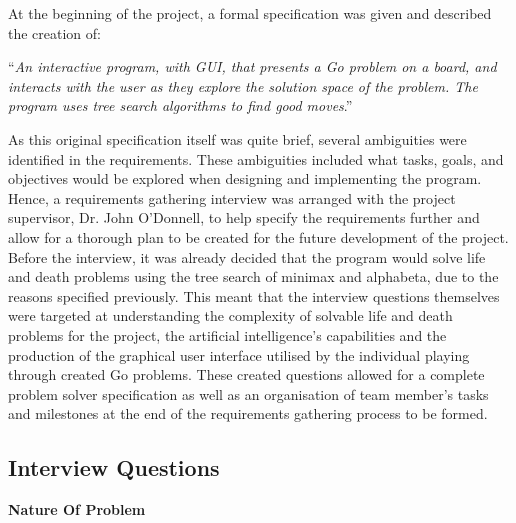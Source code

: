 \documentclass{l3proj}
\begin{document}
At the beginning of the project, a formal specification was given and described the creation of: 
\begin{center}
“\textit{An interactive program, with GUI, that presents a Go problem on a board, and interacts with the user as they explore the solution space of the problem. The program uses tree search algorithms to find good moves}.”  
\end{center}
As this original specification itself was quite brief, several ambiguities were identified in the requirements. These ambiguities included what tasks, goals, and objectives would be explored when designing and implementing the program. Hence, a requirements gathering interview was arranged with the project supervisor, Dr. John O’Donnell, to help specify the requirements further and allow for a thorough plan to be created for the future development of the project. Before the interview, it was already decided that the program would solve life and death problems using the tree search of minimax and alphabeta, due to the reasons specified previously. This meant that the interview questions themselves were targeted at understanding the complexity of solvable life and death problems for the project, the artificial intelligence's capabilities and the production of the graphical user interface utilised by the individual playing through created Go problems. These created questions allowed for a complete problem solver specification as well as an organisation of team member's tasks and milestones at the end of the requirements gathering process to be formed.

\subsection{Interview Questions}

\textbf{Nature Of Problem}
\end{document}
